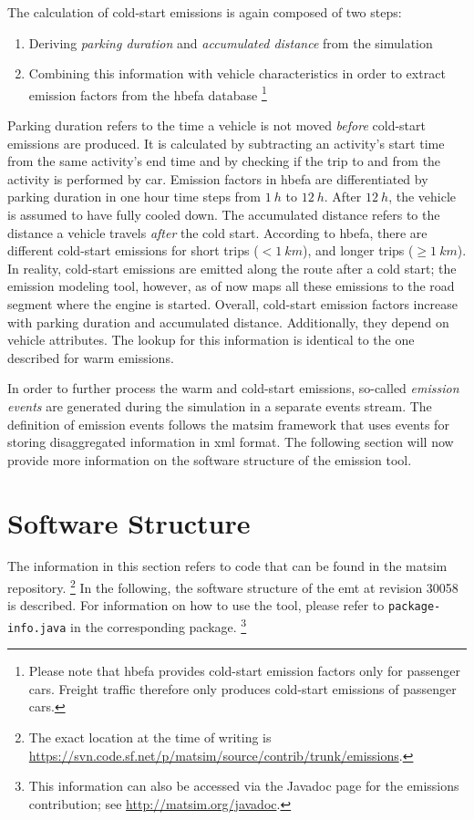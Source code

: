 The calculation of cold-start emissions is again composed of two steps:
%
\begin{enumerate}
 \item Deriving \emph{parking duration} and \emph{accumulated distance} 
 from the simulation
 \item Combining this information with vehicle characteristics in order to 
 extract emission factors from the \gls{hbefa} database%
 \footnote{
 Please note that \gls{hbefa} provides cold-start emission factors only for 
 passenger cars. Freight traffic therefore only produces cold-start emissions 
 of passenger cars.
 }
\end{enumerate}
%
Parking duration refers to the time a vehicle is not moved \emph{before} 
cold-start emissions are produced. It is calculated by subtracting an 
activity's start time from the same activity's end time and by checking if the 
trip to and from the activity is performed by car. Emission factors in 
\gls{hbefa} 
are differentiated by parking duration in one hour time steps from $1~h$ to 
$12~h$. After $12~h$, the vehicle is assumed to have fully cooled down.
%
The accumulated distance refers to the distance a vehicle travels \emph{after} 
the cold start. According to \gls{hbefa}, there are different cold-start 
emissions 
for short trips ($<1~km$), and longer trips ($\geq 1~km$). In reality, 
cold-start emissions are emitted along the route after a cold start; the 
emission modeling tool, however, as of now maps all these emissions to the 
road segment where the engine is started.
%
Overall, cold-start emission factors increase with parking duration and 
accumulated distance. Additionally, they depend on vehicle attributes. The 
lookup for this information is identical to the one described for warm 
emissions.

In order to further process the warm and cold-start emissions, so-called 
\emph{emission events} are generated during the simulation in a separate 
events stream. The definition of emission events follows the \gls{matsim} 
framework that uses events for storing disaggregated information in 
\acrshort{xml} format. The following section will now provide more information 
on the software structure of the emission tool.

\section{Software Structure}
\label{ch:emissions:structure}
The information in this section refers to code that can be found in the 
\gls{matsim} repository.%
%
\footnote{
%
The exact location at the time of writing is 
\url{https://svn.code.sf.net/p/matsim/source/contrib/trunk/emissions}.
%
}
In the following, the software structure of the \gls{emt} at 
revision 30058 is described. For information on how to use the tool, please 
refer to \texttt{package-info.java} in the corresponding package.%
%
\footnote{
%
This information can also be accessed via the Javadoc page for the emissions contribution; see \url{http://matsim.org/javadoc}.
%
}
%


